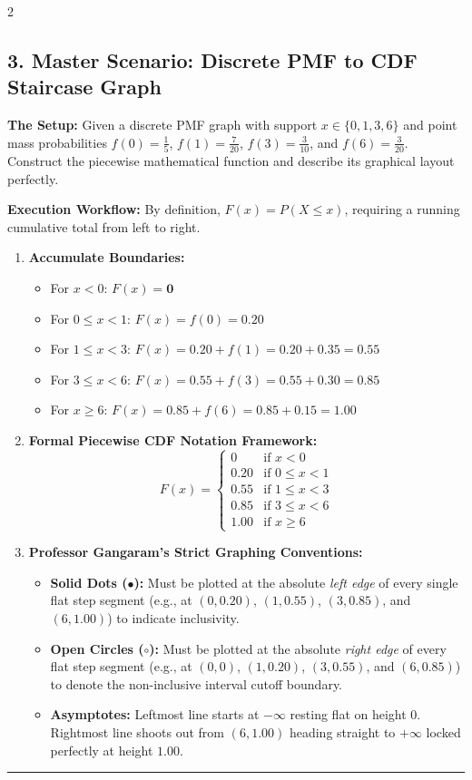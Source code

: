 \documentclass[9pt,landscape]{article}
\begin{document}
\begin{multicols*}{2}
\subsection*{3. Master Scenario: Discrete PMF to CDF Staircase Graph}
\textbf{The Setup:} Given a discrete PMF graph with support $x \in \{0, 1, 3, 6\}$ and point mass probabilities $f(0)=\frac{1}{5}$, $f(1)=\frac{7}{20}$, $f(3)=\frac{3}{10}$, and $f(6)=\frac{3}{20}$. Construct the piecewise mathematical function and describe its graphical layout perfectly.

\textbf{Execution Workflow:}
By definition, $F(x) = P(X \le x)$, requiring a running cumulative total from left to right.
\begin{enumerate}
    \item \textbf{Accumulate Boundaries:} 
    \begin{itemize}
        \item For $x < 0$: $F(x) = \mathbf{0}$
        \item For $0 \le x < 1$: $F(x) = f(0) = \mathbf{0.20}$
        \item For $1 \le x < 3$: $F(x) = 0.20 + f(1) = 0.20 + 0.35 = \mathbf{0.55}$
        \item For $3 \le x < 6$: $F(x) = 0.55 + f(3) = 0.55 + 0.30 = \mathbf{0.85}$
        \item For $x \ge 6$: $F(x) = 0.85 + f(6) = 0.85 + 0.15 = \mathbf{1.00}$
    \end{itemize}
    \item \textbf{Formal Piecewise CDF Notation Framework:}
    $$F(x) = \begin{cases} 
      0 & \text{if } x < 0 \\ 
      0.20 & \text{if } 0 \le x < 1 \\ 
      0.55 & \text{if } 1 \le x < 3 \\ 
      0.85 & \text{if } 3 \le x < 6 \\ 
      1.00 & \text{if } x \ge 6 
   \end{cases}$$
    \item \textbf{Professor Gangaram's Strict Graphing Conventions:}
    \begin{itemize}
        \item \textbf{Solid Dots ($\bullet$):} Must be plotted at the absolute \textit{left edge} of every single flat step segment (e.g., at $(0, 0.20)$, $(1, 0.55)$, $(3, 0.85)$, and $(6, 1.00)$) to indicate inclusivity.
        \item \textbf{Open Circles ($\circ$):} Must be plotted at the absolute \textit{right edge} of every flat step segment (e.g., at $(0,0)$, $(1, 0.20)$, $(3, 0.55)$, and $(6, 0.85)$) to denote the non-inclusive interval cutoff boundary.
        \item \textbf{Asymptotes:} Leftmost line starts at $-\infty$ resting flat on height $0$. Rightmost line shoots out from $(6, 1.00)$ heading straight to $+\infty$ locked perfectly at height $1.00$.
    \end{itemize}
\end{enumerate}
\vskip 2pt
\hrule
\vskip 4pt

\end{multicols*}
\end{document}
